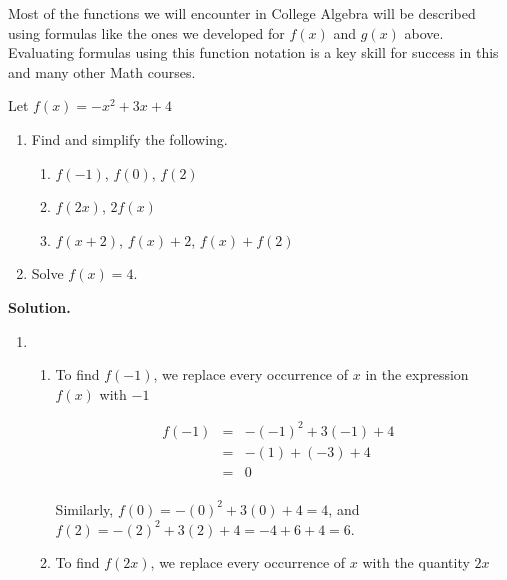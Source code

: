 Most of the functions we will encounter in College Algebra will be described using formulas like the ones we developed for $f(x)$ and $g(x)$ above.  Evaluating formulas using this function notation is a key skill for success in this and many other Math courses.

\medskip

\begin{ex} \label{funcnotatex1} Let $f(x) = -x^2 + 3x + 4$


\begin{enumerate}

\item  Find and simplify the following.

\begin{enumerate}

\item $f(-1)$, $f(0)$, $f(2)$

\item  $f(2x)$, $2 f(x)$

\item $f(x+2)$, $f(x)+2$, $f(x) + f(2)$

\end{enumerate}

\item  Solve $f(x) = 4$.

\end{enumerate}

\medskip

{\bf Solution.}

\begin{enumerate}

\item \begin{enumerate} \item  To find $f(-1)$, we replace every occurrence of $x$ in the expression $f(x)$ with $-1$

\[ \begin{array}{rclr}  
f(-1) & = & -(-1)^2 + 3(-1) + 4 & \\
      & = & -(1) + (-3) + 4 & \\ 
      & = & 0 & \\ 
      \end{array} \]


Similarly, $f(0) = -(0)^2 + 3(0) + 4 = 4$, and $f(2) = -(2)^2 + 3(2) + 4 = -4+6+4 = 6$.

\item To find $f(2x)$, we replace every occurrence of $x$ with the quantity $2x$


\end{enumerate}
\end{enumerate}
\end{ex}
